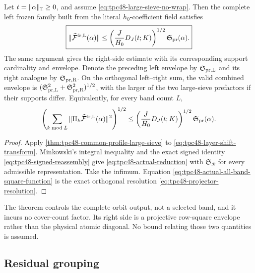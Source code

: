 \begin{theorem}
\label{thm:tpc48-actual-reduction}
Let \(t=\|\alpha\|_\mathbb T\ge0\), and assume
\eqref{eq:tpc48-large-sieve-no-wrap}.  Then the complete left frozen
family built from the literal \(h_0\)-coefficient field satisfies
\begin{equation}
 \boxed{
 \|\widehat{\mathcal F}^{\rm fr,\mathrm L}(\alpha)\|
 \le
 \left(\frac{J}{H_0}D_J(t;K)\right)^{1/2}
 \mathfrak S_{\rm pr}(\alpha).}
 \label{eq:tpc48-actual-reduction}
\end{equation}
The same argument gives the right-side estimate with its corresponding
support cardinality and envelope.  Denote the preceding left envelope
by \(\mathfrak S_{\rm pr,\mathrm L}\) and its right analogue by
\(\mathfrak S_{\rm pr,\mathrm R}\).  On the orthogonal left--right sum,
the valid combined envelope is
\((\mathfrak S_{\rm pr,\mathrm L}^2+
\mathfrak S_{\rm pr,\mathrm R}^2)^{1/2}\), with the larger of the two
large-sieve prefactors if their supports differ.
Equivalently, for every band count \(L\),
\begin{equation}
 \left(
 \sum_{k\bmod L}
 \|\Pi_k\widehat{\mathcal F}^{\rm fr,\mathrm L}(\alpha)\|^2
 \right)^{1/2}
 \le
 \left(\frac{J}{H_0}D_J(t;K)\right)^{1/2}
 \mathfrak S_{\rm pr}(\alpha).
 \label{eq:tpc48-actual-all-band-square-function}
\end{equation}
\end{theorem}

\begin{proof}
Apply \cref{thm:tpc48-common-profile-large-sieve} to
\eqref{eq:tpc48-layer-shift-transform}.  Minkowski's integral
inequality and the exact signed identity
\eqref{eq:tpc48-signed-reassembly} give
\eqref{eq:tpc48-actual-reduction} with
\(\mathfrak S_{\mathscr R}\) for every admissible representation.
Take the infimum.  Equation
\eqref{eq:tpc48-actual-all-band-square-function} is the exact
orthogonal resolution \eqref{eq:tpc48-projector-resolution}.
\end{proof}

The theorem controls the complete orbit output, not a selected band,
and it incurs no cover-count factor.  Its right side is a projective
row-square envelope rather than the physical atomic diagonal.  No
bound relating those two quantities is assumed.

\subsection{Residual grouping}

